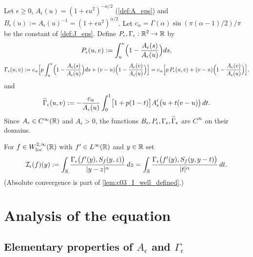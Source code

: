 \begin{definition}
  \label{def:c03_Gamma_eps}
  Let $\epsilon\ge0$, $A_\epsilon(u)=(1+\epsilon u^2)^{-\alpha/2}$ (\cref{def:A_eps}) and
  $B_\epsilon(u):=A_\epsilon(u)^{-1}=(1+\epsilon u^2)^{\alpha/2}$.
  Let $c_\alpha=\Gamma(\alpha)\sin(\pi(\alpha-1)/2)/\pi$ be the constant of \cref{def:J_eps}.
  Define $P_\epsilon,\Gamma_\epsilon:\mathbb{R}^2\to\mathbb{R}$ by
  \[
    P_\epsilon(u,v):=\int_u^v\Bigl(1-\frac{A_\epsilon(s)}{A_\epsilon(u)}\Bigr)ds,
  \]
  \begin{equation}\label{eq:G_epsilon}
    \Gamma_\epsilon(u,v):=c_\alpha\Bigl[p\int_u^v\Bigl(1-\frac{A_\epsilon(s)}{A_\epsilon(u)}\Bigr)ds+(v-u)\Bigl(1-\frac{A_\epsilon(v)}{A_\epsilon(u)}\Bigr)\Bigr]
    =c_\alpha\Bigl[p\,P_\epsilon(u,v)+(v-u)\Bigl(1-\frac{A_\epsilon(v)}{A_\epsilon(u)}\Bigr)\Bigr],
  \end{equation}
  and
  \[
    \widetilde{\Gamma}_\epsilon(u,v):=-\frac{c_\alpha}{A_\epsilon(u)}\int_0^1\bigl[1+p(1-t)\bigr]A_\epsilon'\bigl(u+t(v-u)\bigr)\,dt .
  \]
  Since $A_\epsilon\in C^\infty(\mathbb{R})$ and $A_\epsilon>0$, the functions $B_\epsilon,P_\epsilon,\Gamma_\epsilon,\widetilde{\Gamma}_\epsilon$ are $C^\infty$ on their domains.
\end{definition}

\begin{definition}
  \label{def:c03_I_eps}
  For $f\in W^{2,\infty}_{\textup{loc}}(\mathbb{R})$ with $f'\in L^\infty(\mathbb{R})$ and $y\in\mathbb{R}$ set
  \[
    \mathcal{I}_\epsilon(f)(y):=\int_{\mathbb{R}}\frac{\Gamma_\epsilon\bigl(f'(y),S_f(y,z)\bigr)}{|y-z|^\alpha}\,dz
    =\int_{\mathbb{R}}\frac{\Gamma_\epsilon\bigl(f'(y),S_f(y,y-t)\bigr)}{|t|^\alpha}\,dt .
  \]
  (Absolute convergence is part of \cref{lem:c03_I_well_defined}.)
\end{definition}

\section{Analysis of the equation}

\subsection{Elementary properties of $A_\epsilon$ and $\Gamma_\epsilon$}

